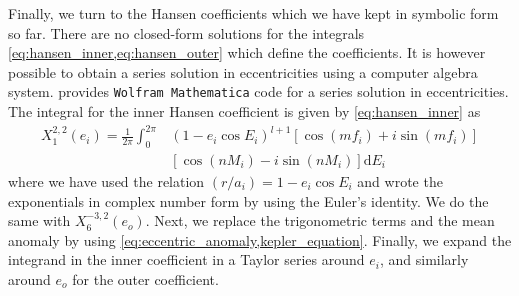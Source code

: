 \documentclass[ twoside,openright,titlepage,numbers=noenddot,headinclude,%
                footinclude=true,cleardoublepage=empty,abstractoff, %
                BCOR=5mm,paper=a4,fontsize=11pt,%
                american,%
                ]{scrreprt}
\begin{document}
Finally, we turn to the Hansen coefficients which we have kept in symbolic 
form so far. There are no closed-form solutions for the integrals 
\cref{eq:hansen_inner,eq:hansen_outer} which define the coefficients. 
It is however possible to obtain a series solution in eccentricities 
using a computer algebra system. 
\Cite{Mardling2013} provides \texttt{Wolfram Mathematica} \citep{Mathematica} code 
for a series solution in eccentricities. The integral
for the inner Hansen coefficient is given by \cref{eq:hansen_inner} as
\begin{equation}
    \begin{aligned}
        X^{2,2}_1(e_i)= \frac{1}{2\pi} \int^{2\pi}_0 &(1-e_i\cos E_i)^{l+1}
        \left[\cos(mf_i)+i\sin(mf_i)\right]\\
        &\left[\cos(nM_i)-i\sin(nM_i)\right]\mathrm{d}E_i
    \end{aligned}
\end{equation}
where we have used the relation $(r/a_i)=1-e_i\cos E_i$ and wrote the 
exponentials in complex number form by using the Euler's identity. We 
do the same with $X^{-3,2}_6(e_o)$. Next, we replace the trigonometric 
terms and the mean anomaly
by using \cref{eq:eccentric_anomaly,kepler_equation}. Finally,
we expand the integrand in the inner coefficient in a Taylor series 
around $e_i$, and similarly around $e_o$ for the outer coefficient.
\end{document}

